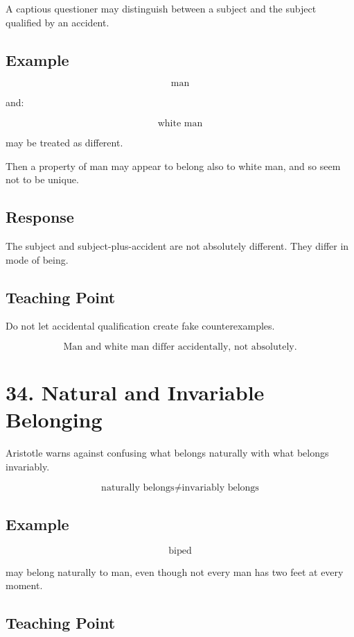 \documentclass[12pt]{article}
\begin{document}
A captious questioner may distinguish between a subject and the subject
qualified by an accident.

\subsection*{Example}

\[
\text{man}
\]

and:

\[
\text{white man}
\]

may be treated as different.

Then a property of man may appear to belong also to white man, and so seem not
to be unique.

\subsection*{Response}

The subject and subject-plus-accident are not absolutely different. They differ
in mode of being.

\subsection*{Teaching Point}

Do not let accidental qualification create fake counterexamples.

\[
\boxed{
\text{Man and white man differ accidentally, not absolutely.}
}
\]

\section*{34. Natural and Invariable Belonging}

Aristotle warns against confusing what belongs naturally with what belongs
invariably.

\[
\text{naturally belongs} \neq \text{invariably belongs}
\]

\subsection*{Example}

\[
\text{biped}
\]

may belong naturally to man, even though not every man has two feet at every
moment.

\subsection*{Teaching Point}
\end{document}
